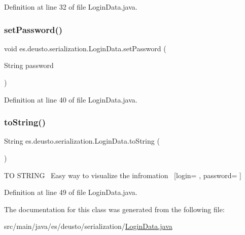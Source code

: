 Definition at line 32 of file Login\+Data.\+java.

\mbox{\label{classes_1_1deusto_1_1serialization_1_1_login_data_a8a744db82f9ddad859e04b6069502409}} 
\subsubsection{\texorpdfstring{set\+Password()}{setPassword()}}
{\footnotesize\ttfamily void es.\+deusto.\+serialization.\+Login\+Data.\+set\+Password (\begin{DoxyParamCaption}\item[{String}]{password }\end{DoxyParamCaption})}



Definition at line 40 of file Login\+Data.\+java.

\mbox{\label{classes_1_1deusto_1_1serialization_1_1_login_data_a638424167a2321d58645b31fe9aef420}} 
\subsubsection{\texorpdfstring{to\+String()}{toString()}}
{\footnotesize\ttfamily String es.\+deusto.\+serialization.\+Login\+Data.\+to\+String (\begin{DoxyParamCaption}{ }\end{DoxyParamCaption})}

TO S\+T\+R\+I\+NG~\newline
Easy way to visualize the infromation~\newline
\mbox{[}login= , password= \mbox{]} 

Definition at line 49 of file Login\+Data.\+java.



The documentation for this class was generated from the following file\+:\begin{DoxyCompactItemize}
\item 
src/main/java/es/deusto/serialization/\hyperlink{_login_data_8java}{Login\+Data.\+java}\end{DoxyCompactItemize}
